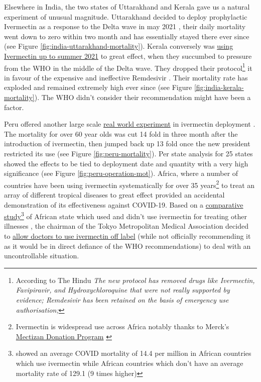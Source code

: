 \documentclass[11pt,a4paper,notitlepage]{report}
\begin{document}
Elsewhere in India, the two states of Uttarakhand and Kerala gave us a natural experiment of unusual magnitude. Uttarakhand decided to deploy prophylactic Ivermectin as a response to the Delta wave in may 2021 \cite{economictimes12052021}, their daily mortality went down to zero within two month and has essentially stayed there ever since (see Figure \ref{fig:india-uttarakhand-mortality}). Kerala conversely was \href{https://dhs.kerala.gov.in/wp-content/uploads/2021/04/Kerala-State-COVID-19-guidelines-Version-3.pdf}{using Ivermectin up to summer 2021} \cite{keralagov24042021} to great effect, when they succumbed to pressure from the WHO in the middle of the Delta wave. They dropped their protocol\footnote{According to The Hindu \cite{hindu06082021} \textit{The new protocol has removed drugs like Ivermectin, Favipiravir, and Hydroxychloroquine that were not really supported by evidence; Remdesivir has been retained on the basis of emergency use authorisation;}} it in favour of the expensive and ineffective Remdesivir \cite{hindu06082021}. Their mortality rate has exploded and remained extremely high ever since (see Figure \ref{fig:india-kerala-mortality}). The WHO didn't consider their recommendation might have been a factor.   

Peru offered another large scale \href{ https://osf.io/9egh4/}{real world experiment} in ivermectin deployment \cite{Chamie2021}. The mortality for over 60 year olds was cut 14 fold in three month after the introduction of ivermectin, then jumped back up 13 fold once the new president restricted its use (see Figure \ref{fig:peru-mortality}). Per state analysis for 25 states showed the effects to be tied to deployment date and quantity with a very high significance (see Figure \ref{fig:peru-operation-mot}). Africa, where a number of countries have been using ivermectin systematically for over 35 years\footnote{Ivermectin is widespread use across Africa notably thanks to Merck's \href{https://www.merck.com/stories/mectizan/}{Mectizan Donation Program} \cite{merck06012021}} to treat an array of different tropical diseases to great effect provided an accidental demonstration of its effectiveness against COVID-19. Based on a \href{https://www.medrxiv.org/content/early/2021/03/26/2021.03.26.21254377.full.pdf}{comparative study}\footnote{\citet{Tanioka2021.03.26.21254377} showed an average COVID mortality of 14.4 per million in African countries which use ivermectin while African countries which don't have an average mortality rate of 129.1 (9 times higher)} of African state which used and didn’t use ivermectin for treating other illnesses \cite{Tanioka2021.03.26.21254377}, the chairman of the Tokyo Metropolitan Medical Association decided to \href{https://www.tokyo-np.co.jp/article/123988}{allow doctors to use ivermectin off label} \cite{tokyoweb13082021} (while not officially recommending it as it would be in direct defiance of the WHO recommendations) to deal with an uncontrollable situation.
\end{document}
